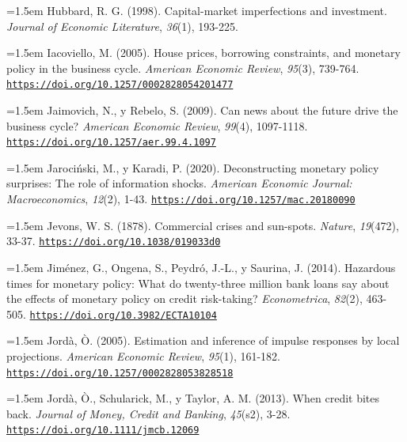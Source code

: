 \documentclass[10pt,a4paper]{article}
\begin{document}
\noindent\hangindent=1.5em Hubbard, R. G. (1998). Capital-market imperfections and investment. \textit{Journal of Economic Literature}, \textit{36}(1), 193-225.

\noindent\hangindent=1.5em Iacoviello, M. (2005). House prices, borrowing constraints, and monetary policy in the business cycle. \textit{American Economic Review}, \textit{95}(3), 739-764. \href{https://doi.org/10.1257/0002828054201477}{\nolinkurl{https://doi.org/10.1257/0002828054201477}}

\noindent\hangindent=1.5em Jaimovich, N., y Rebelo, S. (2009). Can news about the future drive the business cycle? \textit{American Economic Review}, \textit{99}(4), 1097-1118. \href{https://doi.org/10.1257/aer.99.4.1097}{\nolinkurl{https://doi.org/10.1257/aer.99.4.1097}}

\noindent\hangindent=1.5em Jarociński, M., y Karadi, P. (2020). Deconstructing monetary policy surprises: The role of information shocks. \textit{American Economic Journal: Macroeconomics}, \textit{12}(2), 1-43. \href{https://doi.org/10.1257/mac.20180090}{\nolinkurl{https://doi.org/10.1257/mac.20180090}}

\noindent\hangindent=1.5em Jevons, W. S. (1878). Commercial crises and sun-spots. \textit{Nature}, \textit{19}(472), 33-37. \href{https://doi.org/10.1038/019033d0}{\nolinkurl{https://doi.org/10.1038/019033d0}}

{\sloppy\noindent\hangindent=1.5em Jiménez, G., Ongena, S., Peydró, J.-L., y Saurina, J. (2014). Hazardous times for monetary policy: What do twenty-three million bank loans say about the effects of monetary policy on credit risk-taking? \textit{Econometrica}, \textit{82}(2), 463-505. \href{https://doi.org/10.3982/ECTA10104}{\nolinkurl{https://doi.org/10.3982/ECTA10104}}\par}

\noindent\hangindent=1.5em Jordà, Ò. (2005). Estimation and inference of impulse responses by local projections. \textit{American Economic Review}, \textit{95}(1), 161-182. \href{https://doi.org/10.1257/0002828053828518}{\nolinkurl{https://doi.org/10.1257/0002828053828518}}

\noindent\hangindent=1.5em Jordà, Ò., Schularick, M., y Taylor, A. M. (2013). When credit bites back. \textit{Journal of Money, Credit and Banking}, \textit{45}(s2), 3-28. \href{https://doi.org/10.1111/jmcb.12069}{\nolinkurl{https://doi.org/10.1111/jmcb.12069}}
\end{document}
